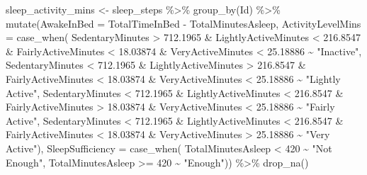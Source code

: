 \documentclass[
]{article}
\newenvironment{Shaded}{\begin{snugshade}}{\end{snugshade}}
\newcommand{\AttributeTok}[1]{\textcolor[rgb]{0.77,0.63,0.00}{#1}}
\newcommand{\DecValTok}[1]{\textcolor[rgb]{0.00,0.00,0.81}{#1}}
\newcommand{\FloatTok}[1]{\textcolor[rgb]{0.00,0.00,0.81}{#1}}
\newcommand{\FunctionTok}[1]{\textcolor[rgb]{0.00,0.00,0.00}{#1}}
\newcommand{\NormalTok}[1]{#1}
\newcommand{\OtherTok}[1]{\textcolor[rgb]{0.56,0.35,0.01}{#1}}
\newcommand{\SpecialCharTok}[1]{\textcolor[rgb]{0.00,0.00,0.00}{#1}}
\newcommand{\StringTok}[1]{\textcolor[rgb]{0.31,0.60,0.02}{#1}}
\begin{document}
\begin{Shaded}
\begin{Highlighting}[]
\NormalTok{sleep\_activity\_mins }\OtherTok{\textless{}{-}}\NormalTok{ sleep\_steps }\SpecialCharTok{\%\textgreater{}\%} 
  \FunctionTok{group\_by}\NormalTok{(Id) }\SpecialCharTok{\%\textgreater{}\%}
  \FunctionTok{mutate}\NormalTok{(}\AttributeTok{AwakeInBed =}\NormalTok{ TotalTimeInBed }\SpecialCharTok{{-}}\NormalTok{ TotalMinutesAsleep, }
         \AttributeTok{ActivityLevelMins =} \FunctionTok{case\_when}\NormalTok{(}
\NormalTok{           SedentaryMinutes }\SpecialCharTok{\textgreater{}} \FloatTok{712.1965} \SpecialCharTok{\&}
\NormalTok{             LightlyActiveMinutes }\SpecialCharTok{\textless{}} \FloatTok{216.8547} \SpecialCharTok{\&} 
\NormalTok{             FairlyActiveMinutes }\SpecialCharTok{\textless{}} \FloatTok{18.03874} \SpecialCharTok{\&}
\NormalTok{             VeryActiveMinutes }\SpecialCharTok{\textless{}} \FloatTok{25.18886} \SpecialCharTok{\textasciitilde{}} \StringTok{"Inactive"}\NormalTok{,}
\NormalTok{           SedentaryMinutes }\SpecialCharTok{\textless{}} \FloatTok{712.1965} \SpecialCharTok{\&}
\NormalTok{             LightlyActiveMinutes }\SpecialCharTok{\textgreater{}} \FloatTok{216.8547} \SpecialCharTok{\&} 
\NormalTok{             FairlyActiveMinutes }\SpecialCharTok{\textless{}} \FloatTok{18.03874} \SpecialCharTok{\&}
\NormalTok{             VeryActiveMinutes }\SpecialCharTok{\textless{}} \FloatTok{25.18886} \SpecialCharTok{\textasciitilde{}} \StringTok{"Lightly Active"}\NormalTok{,}
\NormalTok{           SedentaryMinutes }\SpecialCharTok{\textless{}} \FloatTok{712.1965} \SpecialCharTok{\&}
\NormalTok{             LightlyActiveMinutes }\SpecialCharTok{\textless{}} \FloatTok{216.8547} \SpecialCharTok{\&} 
\NormalTok{             FairlyActiveMinutes }\SpecialCharTok{\textgreater{}} \FloatTok{18.03874} \SpecialCharTok{\&}
\NormalTok{             VeryActiveMinutes }\SpecialCharTok{\textless{}} \FloatTok{25.18886} \SpecialCharTok{\textasciitilde{}} \StringTok{"Fairly Active"}\NormalTok{,}
\NormalTok{           SedentaryMinutes }\SpecialCharTok{\textless{}} \FloatTok{712.1965} \SpecialCharTok{\&}
\NormalTok{             LightlyActiveMinutes }\SpecialCharTok{\textless{}} \FloatTok{216.8547} \SpecialCharTok{\&}
\NormalTok{             FairlyActiveMinutes }\SpecialCharTok{\textless{}} \FloatTok{18.03874} \SpecialCharTok{\&} 
\NormalTok{             VeryActiveMinutes }\SpecialCharTok{\textgreater{}} \FloatTok{25.18886} \SpecialCharTok{\textasciitilde{}} \StringTok{"Very Active"}\NormalTok{), }
         \AttributeTok{SleepSufficiency =} \FunctionTok{case\_when}\NormalTok{(}
\NormalTok{           TotalMinutesAsleep }\SpecialCharTok{\textless{}} \DecValTok{420} \SpecialCharTok{\textasciitilde{}} \StringTok{"Not Enough"}\NormalTok{,}
\NormalTok{           TotalMinutesAsleep }\SpecialCharTok{\textgreater{}=} \DecValTok{420} \SpecialCharTok{\textasciitilde{}} \StringTok{"Enough"}\NormalTok{)) }\SpecialCharTok{\%\textgreater{}\%} 
  \FunctionTok{drop\_na}\NormalTok{()}



\end{Highlighting}
\end{Shaded}
\end{document}
